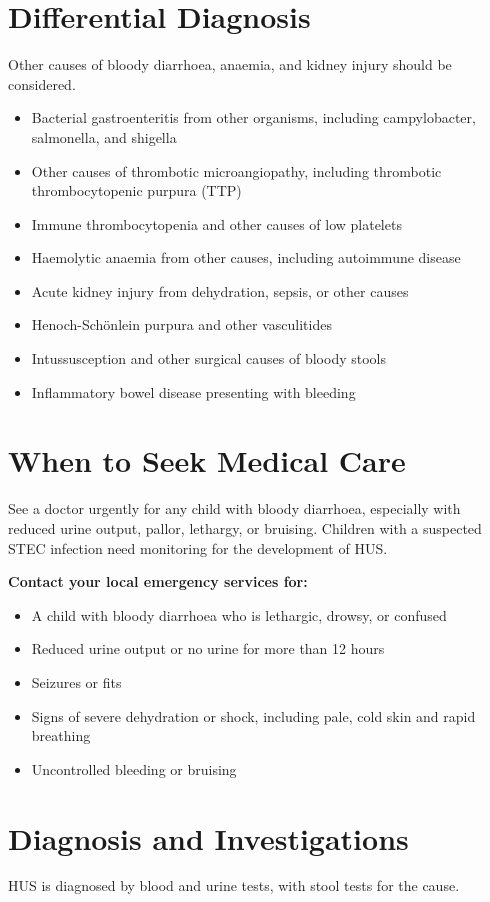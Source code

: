 \section*{Differential Diagnosis}
Other causes of bloody diarrhoea, anaemia, and kidney injury should be considered.

\begin{itemize}
    \item Bacterial gastroenteritis from other organisms, including campylobacter, salmonella, and shigella
    \item Other causes of thrombotic microangiopathy, including thrombotic thrombocytopenic purpura (TTP)
    \item Immune thrombocytopenia and other causes of low platelets
    \item Haemolytic anaemia from other causes, including autoimmune disease
    \item Acute kidney injury from dehydration, sepsis, or other causes
    \item Henoch-Schönlein purpura and other vasculitides
    \item Intussusception and other surgical causes of bloody stools
    \item Inflammatory bowel disease presenting with bleeding
\end{itemize}

\section*{When to Seek Medical Care}
See a doctor urgently for any child with bloody diarrhoea, especially with reduced urine output, pallor, lethargy, or bruising. Children with a suspected STEC infection need monitoring for the development of HUS.

\textbf{Contact your local emergency services for:}
\begin{itemize}
    \item A child with bloody diarrhoea who is lethargic, drowsy, or confused
    \item Reduced urine output or no urine for more than 12 hours
    \item Seizures or fits
    \item Signs of severe dehydration or shock, including pale, cold skin and rapid breathing
    \item Uncontrolled bleeding or bruising
\end{itemize}

\section*{Diagnosis and Investigations}
HUS is diagnosed by blood and urine tests, with stool tests for the cause.

